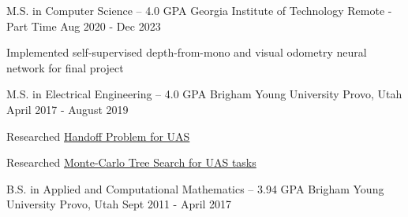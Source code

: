 

\begin{cventries}
  \cventry
    {M.S. in Computer Science -- 4.0 GPA} %
    {Georgia Institute of Technology} %
    {Remote - Part Time} %
    {Aug 2020 - Dec 2023} %
    {
        \begin{cvitems}
            \item{Implemented self-supervised depth-from-mono and visual odometry neural network for final project}
        \end{cvitems}
    }

  \cventry
    {M.S. in Electrical Engineering -- 4.0 GPA} %
    {Brigham Young University} %
    {Provo, Utah} %
    {April 2017 - August 2019} %
    {
        \begin{cvitems}
            \item{Researched \href{https://www.techrxiv.org/doi/full/10.36227/techrxiv.14869476.v1}{\color{awesome-skyblue}Handoff Problem for UAS}}
            \item{Researched \href{https://link.springer.com/article/10.1007/s42452-021-04583-8}{\color{awesome-skyblue}Monte-Carlo Tree Search for UAS tasks}}
        \end{cvitems}
    }

  \cventry
    {B.S. in Applied and Computational Mathematics -- 3.94 GPA} %
    {Brigham Young University} %
    {Provo, Utah} %
    {Sept 2011 - April 2017} %
    {
    }

\end{cventries}
